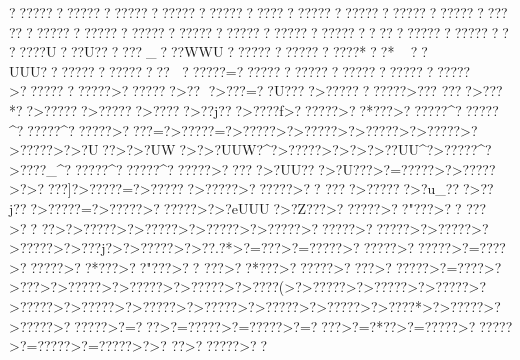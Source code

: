 {{{{{{{{{{{{{{{{{{{{{{{{{{{{{{{{{{{{{{{{{{{{{{{{{{{{{{{{{{{{{{{{{{{{{{{{{{{{{{{{{{{{{{{{{{{{{{{{{{{{{{{{{{{{{{{{{{{{{{{{{{{{{{{{{{{{{{{{{{{{{{{{{{{{{{{{{{{{{{{{{{{{{{{{{{{{{{{{{{{{{{{{{{{{{{{{{{{{{{{{{{{{{{{{{{{{{{{{{{{{{{{{{{{{{{{{{{{{{{{{{{{{{{{{{{{{{{{{{{{{{{{{{{{{{{{{{{{{{{{{{{{{{{{{{{{{{{{{{{{{{{{{{{{{{{{{{{{{{{{{{{{{{{{{{{{{{{{{{{{{{{{{{{{{{{{{{{{{{{{{{{{{{{{{{{{{{{{{{{{{{{{{{{{{{{{{{{{{{{{{{{{{{{{{{{{{{{{{{{{{{{{{{{{{{{{{{{{{{{{{{{{{{{{{{{{{{{{{{{{{{{{{{{{{{{{{{{{{{{{{{{{{{{{{{{{{{{{{{{{{{{{{{{{{{{{{{{{{{{{{{{{{{{{{{{{{{{{{{{{{{{{{{{{{{{{{{{{{{{{{{{{{{{{{{{{{{{{{{{{{{{{{{{{{{{{{{{{{{{{{{{{{{{{{{{{{{{{{{{{{{{{{{{{{{{{{{{{{{{{{{{{{{{{{{{{{{{{{{{{{{{{{{{{{{{{{{{{{{{{{{{{{{{{{{{{{{{{{{{{{{{{{{{{{{{{{{{{{{{{{{{{{{{{{{{{{{{{{{{{{{{{{{{{{{{{{{{{{{{{{{{{{{{{{{{{{{{{{{{{{{{{{{{{{{{{{{{{{{{{{{{{{{{{{{{{{{{{{{{{{{{{{{{{{{{{{{{{{{{{{{{{{{{{{{{{{{{{{{{{{{{{{{{{{{{{{{{{{{{{{{{{{{{{{{{{{{{{{{{{{{{{{{{{{{{{{{{{{{{{{{{{{{{{{{{{{{{{{{{{{{{{{{{{{{{{{{{{{{{{{{{{{{{{{{{{{{{{{{{{{{{{{{{{{{{{{{{{{{{{{{{{{{{{{{{{{{{{{{{{{{{{{{{{{{{{{{{{{{{{{{{{{{{{{{{{{{{{{{{{{{{{{{{{{{{{{{{{{{{{{{{{{{{{{{{{{{{{{{{{{{{{{{{{{{{{{{{{{{{{{{{{{{{{{{{{{{{{{{{{{{{{{{{{{{{{{{{{{{{{{{{{{{{{{{{{{{{{{{{{{{{{{{{{{{{{{{{{{{{{{{{{{{{{{{{{{{{{{{{{{{{{{{{{{{{{{{{{{{{{{{{{{{{{{{{{{{{{{{{{{{{{{{{{{{{{{{{{{{{{{{{{{{{{{{{{{{{{{{{{{{{{{{{{{{{{{{{{{{{{{{{{{{{{{{{{{{{{{{{{{{{{{{{{{{{{{{{{{{{{{{{{{{{{{{{{{{{{{{{{{{{{{{{{{{{{{{{{{{{{{{{{{{{{{{{{{{{{{{{{{{{{{{{{{{{{{{{{{{{{{{{{{{{{{{{{{{{{{{{{{{{{{{{{{{{{{{{{{{{{{{{{{{{{{{{{{{{{{{{{{{{{{{{{{{{{{{{{{{{{{{{{{{{{{{{{{{{{{{{{{{{{{{{{{{{{{{{{{{{{{{{{{{{{{{{{{{{{{{{{{{{{{{{{{{{{{{{{{{{{{{{{{{{{{{{{{{{{{{{{{{{{{{{{{{{{{{{{{{{{{{{{{{{{{{{{{{{{{{{{{{{{{{{{{{{{{{{{{{{{{{{{{{{{{{{{{{{{{{{{{{{{{{{{{{{{{{{{{{{{{{{{{{{{{{{{{{{{{{{{{{{{{{{{{{{{{{{{{{{{{{{{{{{{{{{{{{{{{{{{{{{{{{{{{{{{{{{{{{{{{{{{{{{{{{{{{{{{{{{{{{{{{{{{{{{{{{{{{{{{{{{{{{{{{{{{????????????????????????????????????????????????????????????????????????????????????????????????????????????? ????????????????    ?????U???U??????_???WWU?????????????????*??*
??UUU????????????????
 ??????=??????????????????????????????>????????????>???????>??   ?>???  =??U????>???????????>???
????>???*??>??????>??????>?????>??j???>????f>??????>??*???>??????^??????^??????^??????>??  ??=?>?????=?>?????>?>?????>?>?????>?>?????>?>?????>?>?U??>?>?UW?>?>?UUW?^?>?????>?>?    >?>? ?UU^?>?????^?>????_^??????^??????^??????>??  ???>?UU???>?U???>?=?????>?>?????>?>????]?>?????=?>??????>?????>??????>?? ????>??????>?u_???>??j???>?????=?>?????>??????>?>?eUUU?>?Z???>??????>??"???>??
???>?? 
??>?>?????>?>?????>?>?????>?>?????>??????>??????>?>?????>?>?????>?>???j?>?>?????>?>??.?*>?=?  ??>?=?????>??????>??????>?=? ???>??????>??*???>??"???>??
???>??*???>??????>??  ??>??????>?=? ???>?>???>?>?????>?>?????>?>?????>?>????(>?>?????>?>?????>?>?????>?>?????>?>?????>?>?????>?>?????>?>?????>?>?????>?>????*>?>?????>?>?????>??????>?=? ??>?=?????>?=?????>?=????>?=? *??>?=?????>??????>?=?????>?=?????>?>? 
??>??????>?? }}}}}}}}}}}}}}}}}}}}}}}}}}}}}}}}}}}}}}}}}}}}}}}}}}}}}}}}}}}}}}}}}}}}}}}}}}}}}}}}}}}}}}}}}}}}}}}}}}}}}}}}}}}}}}}}}}}}}}}}}}}}}}}}}}}}}}}}}}}}}}}}}}}}}}}}}}}}}}}}}}}}}}}}}}}}}}}}}}}}}}}}}}}}}}}}}}}}}}}}}}}}}}}}}}}}}}}}}}}}}}}}}}}}}}}}}}}}}}}}}}}}}}}}}}}}}}}}}}}}}}}}}}}}}}}}}}}}}}}}}}}}}}}}}}}}}}}}}}}}}}}}}}}}}}}}}}}}}}}}}}}}}}}}}}}}}}}}}}}}}}}}}}}}}}}}}}}}}}}}}}}}}}}}}}}}}}}}}}}}}}}}}}}}}}}}}}}}}}}}}}}}}}}}}}}}}}}}}}}}}}}}}}}}}}}}}}}}}}}}}}}}}}}}}}}}}}}}}}}}}}}}}}}}}}}}}}}}}}}}}}}}}}}}}}}}}}}}}}}}}}}}}}}}}}}}}}}}}}}}}}}}}}}}}}}}}}}}}}}}}}}}}}}}}}}}}}}}}}}}}}}}}}}}}}}}}}}}}}}}}}}}}}}}}}}}}}}}}}}}}}}}}}}}}}}}}}}}}}}}}}}}}}}}}}}}}}}}}}}}}}}}}}}}}}}}}}}}}}}}}}}}}}}}}}}}}}}}}}}}}}}}}}}}}}}}}}}}}}}}}}}}}}}}}}}}}}}}}}}}}}}}}}}}}}}}}}}}}}}}}}}}}}}}}}}}}}}}}}}}}}}}}}}}}}}}}}}}}}}}}}}}}}}}}}}}}}}}}}}}}}}}}}}}}}}}}}}}}}}}}}}}}}}}}}}}}}}}}}}}}}}}}}}}}}}}}}}}}}}}}}}}}}}}}}}}}}}}}}}}}}}}}}}}}}}}}}}}}}}}}}}}}}}}}}}}}}}}}}}}}}}}}}}}}}}}}}}}}}}}}}}}}}}}}}}}}}}}}}}}}}}}}}}}}}}}}}}}}}}}}}}}}}}}}}}}}}}}}}}}}}}}}}}}}}}}}}}}}}}}}}}}}}}}}}}}}}}}}}}}}}}}}}}}}}}}}}}}}}}}}}}}}}}}}}}}}}}}}}}}}}}}}}}}}}}}}}}}}}}}}}}}}}}}}}}}}}}}}}}}}}}}}}}}}}}}}}}}}}}}}}}}}}}}}}}}}}}}}}}}}}}}}}}}}}}}}}}}}}}}}}}}}}}}}}}}}}}}}}}}}}}}}}}}}}}}}}}}}}}}}}}}}}}}}}}}}}}}}}}}}}}}}}}}}}}}}}}}}}}}}}}}}}}}}}}}}}}}}}}}}}}}}}}}}}}}}}}}}}}}}}}}}}}}}}}}}}}}}}}}}}}}}}}}}}}}}}}}}}}}}}}}}}}}}}}}}}}}}}}}}}}}}}}}}}}}}}}}}}}}}}}}}}}}}}}}}}}}}}}}}}}}}}}}}}}}}}}}}}}}}}}}}}}}}}}}}}}}}}}}}}}}}}}}}}}}}}}}}}}}}}}}}}}}}}}}}}}}}}}}}}}}}}}}}}}}}}}}}}}}}}}}}}}}}}}}}}}}}}}}}}}}}}}}}}}}}}}}}}}}}}}}}}}}}}}}}}}}}}}}}}}}}}}}}}}}}}}}}}}}}}}}}}}}}}}}}}}}}}}}}}}}}}}}}}}}}}}}}}}}}}}}}}}}}}}}}}}}}}}}}}}}}}}}}}}}}}}}}}}}}}}}}}}}}}}}}}}}}}}}}}}}}}}}}}}}}}}}}}}}}}}}}}}}}}}}}}}}}}}}}}}}}}}}}}}}}}}}}}}}}}}}}}}}}}}}}}}}}}}}}}}}}}}}}}}}}}}}}}}}}}}}}}}}}}}}}}}}}}}}}}}}}}}}}}}}}}}}}}}}}}}}}}}}}}}}}}}}}}}}}}}}}}}}}}}
